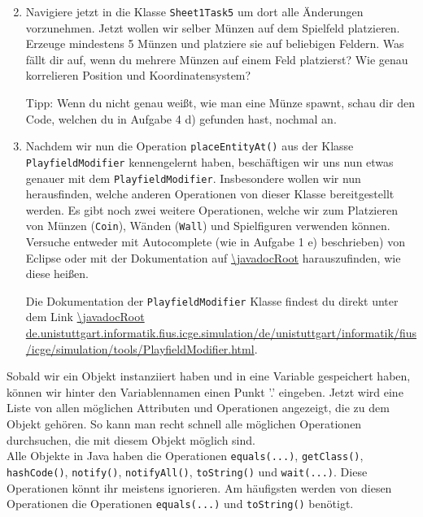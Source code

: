 \begin{enumerate} \setcounter{enumi}{1}
    \item Navigiere jetzt in die Klasse \lstinline{Sheet1Task5} um dort alle Änderungen vorzunehmen. 
        Jetzt wollen wir selber Münzen auf dem Spielfeld platzieren. 
        Erzeuge mindestens 5 Münzen und platziere sie auf beliebigen Feldern. 
        Was fällt dir auf, wenn du mehrere Münzen auf einem Feld platzierst?
        Wie genau korrelieren Position und Koordinatensystem?

        Tipp: Wenn du nicht genau weißt, wie man eine Münze spawnt, schau dir den Code, welchen du in Aufgabe 4 d) gefunden hast, nochmal an.

    \item Nachdem wir nun die Operation \lstinline{placeEntityAt()} aus der Klasse \lstinline{PlayfieldModifier} kennengelernt haben, beschäftigen wir uns nun etwas genauer mit dem \lstinline{PlayfieldModifier}. 
        Insbesondere wollen wir nun herausfinden, welche anderen Operationen von dieser Klasse bereitgestellt werden. 
        Es gibt noch zwei weitere Operationen, welche wir zum Platzieren von Münzen (\lstinline{Coin}), Wänden (\lstinline{Wall}) und Spielfiguren verwenden können. 
        Versuche entweder mit Autocomplete (wie in Aufgabe 1 e) beschrieben) von Eclipse oder mit der Dokumentation auf \url{\javadocRoot} harauszufinden, wie diese heißen.

        Die Dokumentation der \lstinline{PlayfieldModifier} Klasse findest du direkt unter dem Link \url{\javadocRoot de.unistuttgart.informatik.fius.icge.simulation/de/unistuttgart/informatik/fius/icge/simulation/tools/PlayfieldModifier.html}.
        
\end{enumerate}

\begin{Infobox}[Autocompletion]
    Sobald wir ein Objekt instanziiert haben und in eine Variable gespeichert haben, können wir hinter den Variablennamen einen Punkt '.' eingeben. 
    Jetzt wird eine Liste von allen möglichen Attributen und Operationen angezeigt, die zu dem Objekt gehören. 
    So kann man recht schnell alle möglichen Operationen durchsuchen, die mit diesem Objekt möglich sind.\\

    Alle Objekte in Java haben die Operationen \lstinline{equals(...)}, \lstinline{getClass()}, \lstinline{hashCode()}, \lstinline{notify()}, \lstinline{notifyAll()}, \lstinline{toString()} und \lstinline{wait(...)}.
    Diese Operationen könnt ihr meistens ignorieren.
    Am häufigsten werden von diesen Operationen die Operationen \lstinline{equals(...)} und \lstinline{toString()} benötigt.
\end{Infobox}

